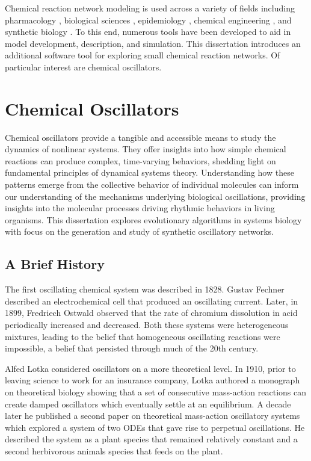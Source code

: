 \documentclass[12pt]{report}
\begin{document}
Chemical reaction network modeling is used across a variety of fields including pharmacology \cite{Zou2020}, biological sciences \cite{Liu2020}, epidemiology \cite{Bjrnstad2020, Mun2021}, chemical engineering \cite{Feinberg1987}, and synthetic biology \cite{Chandran2008}. To this end, numerous tools have been developed to aid in model development, description, and simulation. This dissertation introduces an additional software tool for exploring small chemical reaction networks. Of particular interest are chemical oscillators.


\section{Chemical Oscillators}
\label{section:intro_oscillators}

Chemical oscillators provide a tangible and accessible means to study the dynamics of nonlinear systems. They offer insights into how simple chemical reactions can produce complex, time-varying behaviors, shedding light on fundamental principles of dynamical systems theory. Understanding how these patterns emerge from the collective behavior of individual molecules can inform our understanding of the mechanisms underlying biological oscillations, providing insights into the molecular processes driving rhythmic behaviors in living organisms. This dissertation explores evolutionary algorithms in systems biology with focus on the generation and study of synthetic oscillatory networks.

\subsection{A Brief History}
The first oscillating chemical system was described in 1828. Gustav Fechner described an electrochemical cell that produced an oscillating current. Later, in 1899, Fredriech Ostwald observed that the rate of chromium dissolution in acid periodically increased and decreased. Both these systems were heterogeneous mixtures, leading to the belief that homogeneous oscillating reactions were impossible, a belief that persisted through much of the 20th century. 

Alfed Lotka considered oscillators on a more theoretical level. In 1910, prior to leaving science to work for an insurance company, Lotka authored a monograph on theoretical biology \cite{Lotka1910} showing that a set of consecutive mass-action reactions can create damped oscillators which eventually settle at an equilibrium. A decade later he published a second paper on theoretical mass-action oscillatory systems \cite{Lotka1920, Lotka1920b} which explored a system of two ODEs that gave rise to perpetual oscillations. He described the system as a plant species that remained relatively constant and a second herbivorous animals species that feeds on the plant.
\end{document}
